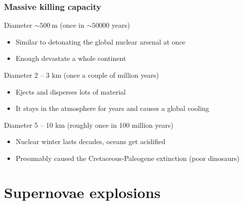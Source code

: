\documentclass[aspectratio=169]{beamer}
\begin{document}
\begin{frame}
\frametitle{Massive killing capacity}

\begin{block}{Diameter $\sim 500 \: \mathrm{m}$ (once in $\sim 50000$ years)}
\begin{itemize}
\item Similar to detonating the global nuclear arsenal at once
\item Enough devastate a whole continent
\end{itemize}
\end{block}

\begin{block}{Diameter 2 -- 3 km (once a couple of million years)}
\begin{itemize}
\item Ejects and disperses lots of material
\item It stays in the atmosphere for years and causes a global cooling
\end{itemize}
\end{block}

\begin{block}{Diameter 5 -- 10 km (roughly once in 100 million years)}
\begin{itemize}
\item Nuclear winter lasts decades, oceans get acidified
\item Presumably caused the Cretaceous-Paleogene extinction (poor dinosaurs)
\end{itemize}
\end{block}
\end{frame}

\section{Supernovae explosions}
\end{document}
